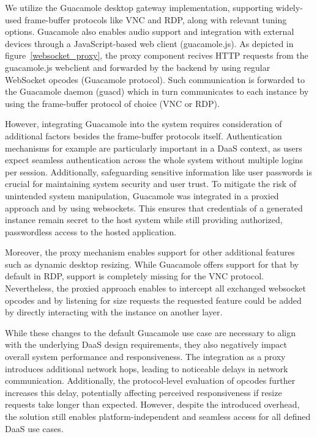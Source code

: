 \documentclass[runningheads]{llncs}
\begin{document}
We utilize the Guacamole desktop gateway implementation,
supporting widely-used frame-buffer protocols like VNC and RDP,
along with relevant tuning options.
Guacamole also enables audio support and integration with external devices
through a JavaScript-based web client (guacamole.js).
As depicted in figure~\ref{websocket_proxy},
the proxy component recives HTTP requests from the guacamole.js webclient
and forwarded by the backend by using regular WebSocket opcodes (Guacamole protocol).
Such communication is forwarded to the Guacamole daemon (guacd)
which in turn communicates to each instance
by using the frame-buffer protocol of choice (VNC or RDP).


However, integrating Guacamole into the system
requires consideration of additional factors besides the frame-buffer protocols itself.
Authentication mechanisms for example are particularly important in a DaaS context,
as users expect seamless authentication across the whole system
without multiple logins per session.
Additionally, safeguarding sensitive information like user passwords is crucial
for maintaining system security and user trust.
To mitigate the risk of unintended system manipulation, Guacamole was integrated
in a proxied approach and by using websockets.
This ensures that credentials of a generated instance remain secret to the host system
while still providing authorized, passwordless access to the hosted application.

Moreover, the proxy mechanism enables support for other additional features
such as dynamic desktop resizing.
While Guacamole offers support for that by default in RDP,
support is completely missing for the VNC protocol.
Nevertheless, the proxied approach enables to intercept all exchanged websocket opcodes
and by listening for size requests
the requested feature could be added
by directly interacting with the instance on another layer.

While these changes to the default Guacamole use case are necessary to align
with the underlying DaaS design requirements,
they also negatively impact overall system performance and responsiveness.
The integration as a proxy introduces additional network hops,
leading to noticeable delays in network communication.
Additionally, the protocol-level evaluation of opcodes further increases this delay,
potentially affecting perceived responsiveness
if resize requests take longer than expected.
However, despite the introduced overhead,
the solution still enables platform-independent
and seamless access for all defined DaaS use cases.
\end{document}
